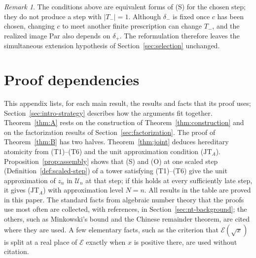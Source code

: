 \documentclass[11pt]{article}
\theoremstyle{plain}
\theoremstyle{definition}
\theoremstyle{remark}
\newtheorem{remark}[theorem]{Remark}
\begin{document}
\begin{remark}\label{rem:comparison-scope}
The conditions above are equivalent forms of (S) for the chosen step; they
do not produce a step with $|T_-|=1$.  Although $\delta_-$ is fixed once $c$ has been
chosen, changing $c$ to meet another finite prescription can change $T_-$,
and the realized image $\mathrm{Par}$ also depends on $\delta_+$.  The
reformulation therefore leaves the simultaneous extension hypothesis of
Section~\ref{sec:selection} unchanged.
\end{remark}

\section{Proof dependencies}
\label{app:dependencies}

This appendix lists, for each main result, the results and facts that its
proof uses; Section~\ref{sec:intro-strategy} describes how the arguments
fit together.  Theorem~\ref{thm:A} rests on the construction of
Theorem~\ref{thm:construction} and on the factorization results of
Section~\ref{sec:factorization}.  The proof of Theorem~\ref{thm:B} has two
halves.  Theorem~\ref{thm:joint} deduces hereditary atomicity from
\textup{(T1)--(T6)} and the unit approximation condition
\textup{($\mathrm{JT}_A$)}.  Proposition~\ref{prop:assembly} shows that
(S) and (O) at one scaled step (Definition~\ref{def:scaled-step}) of a
tower satisfying \textup{(T1)--(T6)} give the unit approximation of $z_n$
in $\mathcal U_n$ at that step; if this holds at every sufficiently late
step, it gives \textup{($\mathrm{JT}_A$)} with approximation level $N=n$.  All results in
the table are proved in this paper.  The standard facts from algebraic
number theory that the proofs use most often are collected, with
references, in Section~\ref{sec:nt-background}; the others, such as
Minkowski's bound and the Chinese remainder theorem, are cited where they
are used.  A few elementary facts, such as the criterion that
$\mathcal E(\sqrt x)$ is split at a real place of $\mathcal E$ exactly
when $x$ is positive there, are used without citation.
\end{document}
